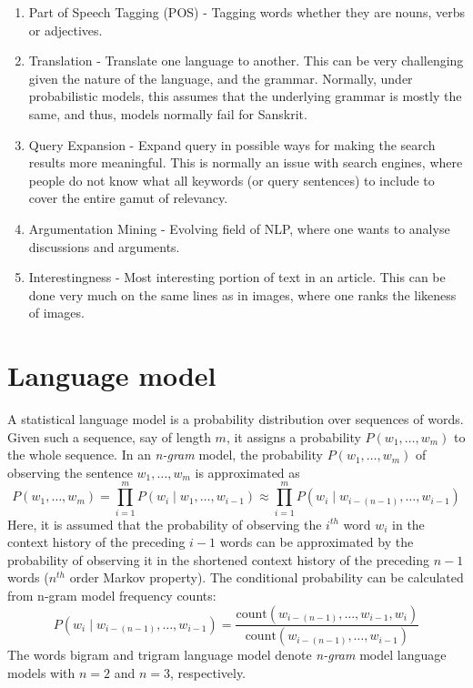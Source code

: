 \documentclass{book}
\begin{document}
\begin{enumerate}
\item Part of Speech Tagging (POS) - Tagging words whether they are nouns, verbs or adjectives.

\item Translation - Translate one language to another. This can be very challenging given the nature of the language, and the grammar. Normally, under probabilistic models, this assumes that the underlying grammar is mostly the same, and thus, models normally fail for Sanskrit.

\item Query Expansion - Expand query in possible ways for making the search results more meaningful. This is normally an issue with search engines, where people do not know what all keywords (or query sentences) to include to cover the entire gamut of relevancy.

\item Argumentation Mining - Evolving field of NLP, where one wants to analyse discussions and arguments.

\item Interestingness - Most interesting portion of text in an article. This can be done very much on the same lines as in images, where one ranks the likeness of images.
\end{enumerate}

\section{Language model}
A statistical language model is a probability distribution over sequences of words. Given such a sequence, say of length $m$, it assigns a probability $P(w_{1},\ldots ,w_{m})$ to the whole sequence. 
In an \emph{n-gram} model, the probability $P(w_{1},\ldots ,w_{m})$ of observing the sentence $w_{1},\ldots ,w_{m}$ is approximated as
\[ P(w_{1},\ldots ,w_{m})=\prod _{{i=1}}^{m}P(w_{i}\mid w_{1},\ldots ,w_{{i-1}})\approx \prod _{{i=1}}^{m}P(w_{i}\mid w_{{i-(n-1)}},\ldots ,w_{{i-1}}) \]
Here, it is assumed that the probability of observing the $i^{th}$ word $w_i$ in the context history of the preceding $i-1$ words can be approximated by the probability of observing it in the shortened context history of the preceding $n-1$ words ($n^{th}$ order Markov property). 
The conditional probability can be calculated from n-gram model frequency counts:
\[ P(w_{i}\mid w_{{i-(n-1)}},\ldots ,w_{{i-1}})={\frac {{\mathrm {count}}(w_{{i-(n-1)}},\ldots ,w_{{i-1}},w_{i})}{{\mathrm {count}}(w_{{i-(n-1)}},\ldots ,w_{{i-1}})}} \]
The words bigram and trigram language model denote \emph{n-gram} model language models with $n=2$ and $n=3$, respectively.
\end{document}
